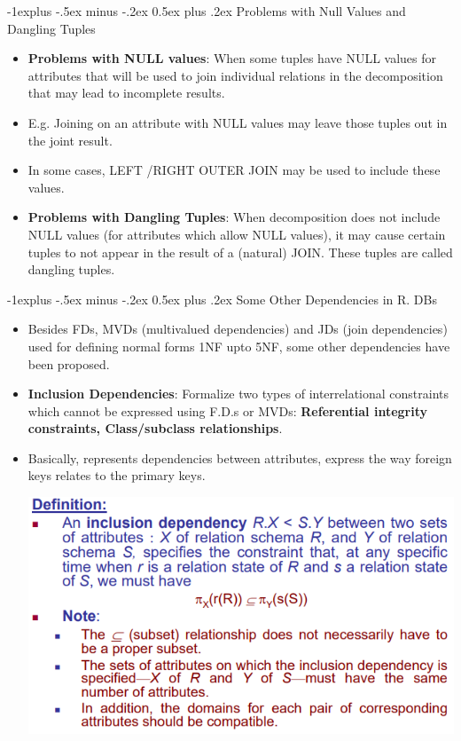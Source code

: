 \documentclass[12pt, landscape]{article}
\makeatletter
\renewcommand{\subsection}{\@startsection{subsection}{2}{0.1mm}%
                                {-1explus -.5ex minus -.2ex}%
                                {0.5ex plus .2ex}%
                                {\normalfont\normalsize\bfseries}}
\makeatother
\begin{document}
\begin{multicols*}{3}
\columnbreak

\subsection{Problems with Null Values and 
Dangling Tuples}
\begin{itemize}
\item \textbf{Problems with NULL values}: When some tuples have NULL values for attributes that will be used to join individual relations in the decomposition that may lead to incomplete results. 
\item E.g. Joining on an attribute with NULL values may leave those tuples out in the joint result.
\item In some cases, LEFT /RIGHT OUTER JOIN may be used to include these values.
\item \textbf{Problems with Dangling Tuples}: When decomposition does not include NULL values (for attributes which allow NULL values), it may cause certain tuples to not appear in the result of a (natural) JOIN. These tuples are called dangling tuples.
\end{itemize}


\subsection{Some Other Dependencies in R. DBs}
\begin{itemize}
\item Besides FDs, MVDs (multivalued dependencies) and JDs 
(join dependencies) used for defining normal forms 1NF 
upto 5NF, some other dependencies have been proposed.
\item \textbf{Inclusion Dependencies}: Formalize two types of interrelational constraints which cannot be expressed using F.D.s or MVDs: \textbf{Referential integrity constraints, Class/subclass relationships}.
\item Basically, represents dependencies between attributes, express the way foreign keys relates to the primary keys. \\ \smallskip
\centerline{\includegraphics[width = 0.8\linewidth]{inclusion}}


\end{itemize}
\end{multicols*}
\end{document}
